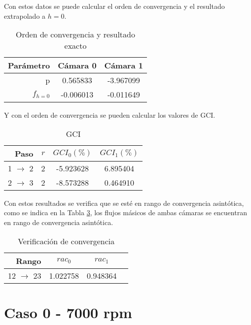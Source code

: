 Con estos datos se puede calcular el orden de convergencia y el resultado
extrapolado a $h=0$.

\begin{table}
    \centering
    \begin{tabular}{rcc}\toprule
        Parámetro & Cámara 0  & Cámara 1  \\ \midrule
        p         &  0.565833 & -3.967099 \\
        $f_{h=0}$ & -0.006013 & -0.011649 \\ \bottomrule
    \end{tabular}
    \caption{Orden de convergencia y resultado exacto}
    \label{tab:res1_caso0}
\end{table}

Y con el orden de convergencia se pueden calcular los valores de GCI.

\begin{table}
    \centering
    \begin{tabular}{rccc}\toprule
        Paso              & $r$ & $GCI_0(\%)$ & $GCI_1(\%)$ \\ \midrule
        1 $\rightarrow$ 2 & 2   & -5.923628   & 6.895404 \\
        2 $\rightarrow$ 3 & 2   & -8.573288   & 0.464910 \\ \bottomrule
    \end{tabular}
    \caption{GCI}
    \label{tab:gci_caso_0}
\end{table}

Con estos resultados se verifica que se esté en rango de convergencia
asintótica, como se indica en la Tabla \ref{tab:rac_caso_0}, los flujos
másicos de ambas cámaras se encuentran en rango de convergencia asintótica.

\begin{table}
    \centering
    \begin{tabular}{rccc}\toprule
        Rango               & $rac_0$  & $rac_1$ \\ \midrule
        12 $\rightarrow$ 23 & 1.022758 & 0.948364 \\ \bottomrule
    \end{tabular}
    \caption{Verificación de convergencia}
    \label{tab:rac_caso_0}
\end{table}


\section{Caso 0 - 7000 rpm}

